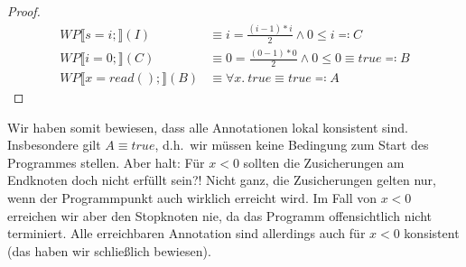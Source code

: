 \documentclass[hidelinks]{article}
\theoremstyle{plain}
\theoremstyle{definition}
\theoremstyle{rem}
\begin{document}
\begin{sloppypar}
\begin{proof}
\begin{align*}
WP\llbracket s=i;\rrbracket(I)&\equiv i=\frac{(i-1)*i}{2}\wedge 0\le i\eqqcolon C\\
WP\llbracket i=0;\rrbracket(C)&\equiv 0=\frac{(0-1)*0}{2}\wedge 0\le 0\equiv true\eqqcolon B\\
WP\llbracket x=read();\rrbracket(B)&\equiv \forall x.\ true\equiv true\eqqcolon A
\end{align*}
\end{proof}
Wir haben somit bewiesen, dass alle Annotationen lokal konsistent sind. Insbesondere gilt $A\equiv true$, d.h.\ wir müssen keine Bedingung zum Start des Programmes stellen. Aber halt: Für $x<0$ sollten die Zusicherungen am Endknoten doch nicht erfüllt sein?! Nicht ganz, die Zusicherungen gelten nur, wenn der Programmpunkt auch wirklich erreicht wird. Im Fall von $x<0$ erreichen wir aber den Stopknoten nie, da das Programm offensichtlich nicht terminiert. Alle erreichbaren Annotation sind allerdings auch für $x<0$ konsistent (das haben wir schließlich bewiesen).

\end{sloppypar}
\end{document}
